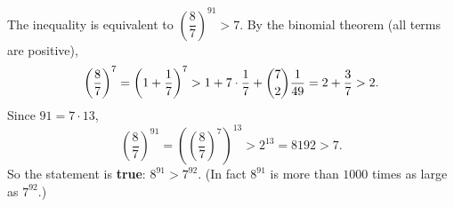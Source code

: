 The inequality is equivalent to $\left(\dfrac87\right)^{91}>7$. By the binomial theorem (all terms are positive),
\[\left(\dfrac87\right)^7=\left(1+\dfrac17\right)^7>1+7\cdot\dfrac17+\dbinom72\dfrac1{49}=2+\dfrac37>2.\]
Since $91=7\cdot13$,
\[\left(\dfrac87\right)^{91}=\left(\left(\dfrac87\right)^7\right)^{13}>2^{13}=8192>7.\]
So the statement is \textbf{true}: $\boxed{8^{91}>7^{92}}$. (In fact $8^{91}$ is more than $1000$ times as large as $7^{92}$.)
